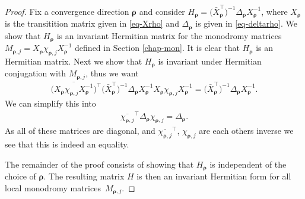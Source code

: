 \documentclass[11pt]{article}
\numberwithin{equation}{section}
\numberwithin{equation}{section}
\begin{document}
\begin{proof}
Fix a convergence direction $\bm\rho$ and consider $H_{\bm\rho} = \big(\bar{X}_{\bm\rho}^{\intercal}\big)^{-1} \Delta_{\bm\rho} X_{\bm\rho}^{-1}$, where $X_{\bm{\rho}}$ is the transitition matrix given in \eqref{eq-Xrho} and $\Delta_{\bm\rho}$ is given in \eqref{eq-deltarho}. We show that $H_{\bm\rho}$ is an invariant Hermitian matrix for the monodromy matrices $M_{\bm\rho,j} = X_{\bm\rho} \chi_{\bm\rho,j} X_{\bm\rho}^{-1}$ defined in Section \ref{chap-mon}. It is clear that $H_{\bm\rho}$ is an Hermitian matrix. Next we show that $H_{\bm\rho}$ is invariant under Hermitian conjugation with $M_{\bm\rho,j}$, thus we want
\begin{gather*}
\big(\overline{X_{\bm\rho} \chi_{\bm\rho,j} X_{\bm\rho}^{-1}}\big)^{\intercal}\big(\bar{X}_{\bm\rho}^{\intercal}\big)^{-1} \Delta_{\bm\rho} X_{\bm\rho}^{-1} X_{\bm\rho} \chi_{\bm\rho,j} X_{\bm\rho}^{-1} = \big(\bar{X}_{\bm\rho}^{\intercal}\big)^{-1} \Delta_{\bm\rho} X_{\bm\rho}^{-1}.
\end{gather*}
We can simplify this into
\begin{gather*}
\overline{\chi_{\bm\rho,j}}^{\intercal}\Delta_{\bm\rho} \chi_{\bm\rho,j} = \Delta_{\bm\rho}.
\end{gather*}
As all of these matrices are diagonal, and $\overline{\chi_{\bm\rho,j}}^{\intercal}$,
$\chi_{\bm\rho,j}$ are each others inverse we see that this is indeed an equality.

The remainder of the proof consists of showing that $H_{\bm\rho}$ is independent of the
choice of $\bm\rho$. The resulting matrix $H$ is then an invariant Hermitian form for all
local monodromy matrices~$M_{\bm\rho,j}$.


\end{proof}
\end{document}

